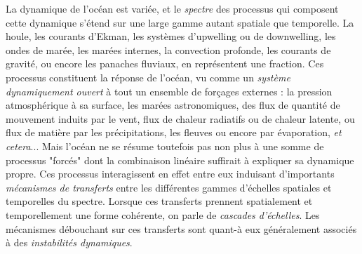 \color{red}La dynamique de l'océan est variée, et le \textit{spectre} des processus qui composent cette dynamique s'étend sur une large gamme autant spatiale que temporelle. La houle, les courants d'Ekman, les systèmes d'upwelling ou de downwelling, les ondes de marée, les marées internes, la convection profonde, les courants de gravité, ou encore les panaches fluviaux, en représentent une fraction. Ces processus constituent la réponse de l'océan, vu comme un \textit{système dynamiquement ouvert} à tout un ensemble de forçages externes : la pression atmosphérique à sa surface, les marées astronomiques, des flux de quantité de mouvement induits par le vent, flux de chaleur radiatifs ou de chaleur latente, ou flux de matière par les précipitations, les fleuves ou encore par évaporation, \textit{et cetera}...\color{black}
Mais l'océan ne se résume toutefois pas non plus à une somme de processus "forcés" dont la combinaison linéaire suffirait à expliquer sa dynamique propre. Ces processus interagissent en effet entre eux induisant d'importants \textit {mécanismes de transferts} entre les différentes gammes d'échelles spatiales et temporelles \color{red}du spectre. Lorsque ces transferts prennent spatialement et temporellement une forme cohérente\color{black}, on parle de \textit{cascades d'échelles}. Les mécanismes débouchant sur ces transferts sont quant-à eux généralement associés à des \textit{instabilités dynamiques}.

